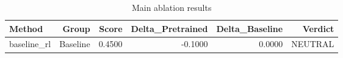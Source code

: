 \begin{table}[htbp]
\centering
\caption{Main ablation results}
\label{tab:main-results}
\begin{tabular}{lrrrrr}
\toprule
\textbf{Method} & \textbf{Group} & \textbf{Score} & \textbf{Delta\_Pretrained} & \textbf{Delta\_Baseline} & \textbf{Verdict} \\
\midrule
baseline\_rl & Baseline & 0.4500 & -0.1000 & 0.0000 & NEUTRAL \\
\bottomrule
\end{tabular}
\end{table}
